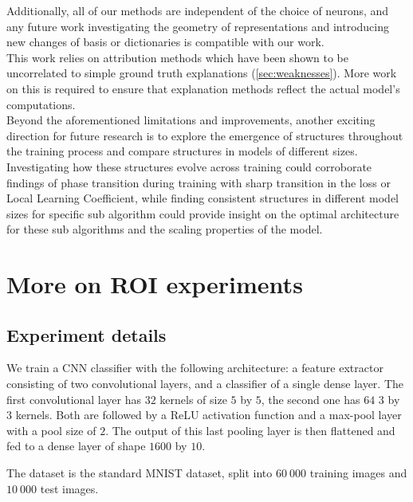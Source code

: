 \documentclass{article}
\begin{document}
Additionally, all of our methods are independent of the choice of neurons, and any future work investigating the geometry of representations and introducing new changes of basis or dictionaries is compatible with our work.\\

This work relies on attribution methods which have been shown to be uncorrelated to simple ground truth explanations (\cref{sec:weaknesses}). More work on this is required to ensure that explanation methods reflect the actual model's computations.\\

Beyond the aforementioned limitations and improvements, another exciting direction for future research is to explore the emergence of structures throughout the training process and compare structures in models of different sizes. Investigating how these structures evolve across training could corroborate findings of phase transition during training with sharp transition in the loss or Local Learning Coefficient, while finding consistent structures in different model sizes for specific sub algorithm could provide insight on the optimal architecture for these sub algorithms and the scaling properties of the model.\\
\clearpage




\newpage
\appendix

\section{More on ROI experiments}
\label{app:ROI}

\subsection{Experiment details}
\label{app:ROI_details}

We train a CNN classifier with the following architecture: a feature extractor consisting of two convolutional layers, and a classifier of a single dense layer. The first convolutional layer has $32$ kernels of size $5$ by $5$, the second one has $64$ $3$ by $3$ kernels. Both are followed by a ReLU activation function and a max-pool layer with a pool size of $2$. The output of this last pooling layer is then flattened and fed to a dense layer of shape $1600$ by $10$.

The dataset is the standard MNIST dataset, split into $60~000$ training images and $10~000$ test images.
\end{document}
